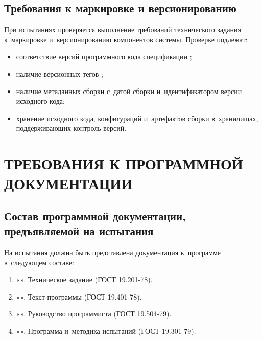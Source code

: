 \documentclass[12pt,a4paper]{extarticle}
\begin{document}
\subsection{Требования к маркировке и версионированию}

\begin{hseExample}
При испытаниях проверяется выполнение требований технического задания к~маркировке и~версионированию компонентов системы. Проверке подлежат:

\begin{itemize}[leftmargin=1.25cm]
    \item соответствие версий программного кода спецификации ;
    \item наличие версионных тегов ;
    \item наличие метаданных сборки с~датой сборки и~идентификатором версии исходного кода;
    \item хранение исходного кода, конфигураций и~артефактов сборки в~хранилищах, поддерживающих контроль версий.
\end{itemize}
\end{hseExample}

\clearpage

\section{ТРЕБОВАНИЯ К ПРОГРАММНОЙ ДОКУМЕНТАЦИИ}

\subsection{Состав программной документации, предъявляемой на испытания}


На испытания должна быть представлена документация к~программе в~следующем составе:
\begin{enumerate}[label=\arabic*), leftmargin=1.25cm]
    \item «\projectname». Техническое задание (ГОСТ 19.201-78).
    \item «\projectname». Текст программы (ГОСТ 19.401-78).
    \item «\projectname». Руководство программиста (ГОСТ 19.504-79).
    \item «\projectname». Программа и~методика испытаний
          (ГОСТ 19.301-79).
\end{enumerate}
\end{document}
